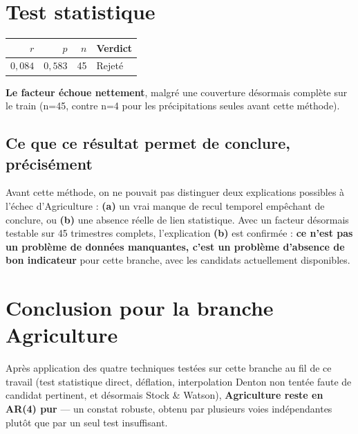 \documentclass[11pt,a4paper]{article}
\begin{document}
\section{Test statistique}

\begin{alertebox}
\begin{center}
\begin{tabular}{rrrl}
\toprule
$r$ & $p$ & $n$ & \textbf{Verdict} \\
\midrule
$0{,}084$ & $0{,}583$ & 45 & Rejeté \\
\bottomrule
\end{tabular}
\end{center}

\textbf{Le facteur échoue nettement}, malgré une couverture désormais complète sur le train (n=45, contre n=4 pour les précipitations seules avant cette méthode).
\end{alertebox}

\subsection{Ce que ce résultat permet de conclure, précisément}

\begin{noteboxbleu}
Avant cette méthode, on ne pouvait pas distinguer deux explications possibles à l'échec d'Agriculture : \textbf{(a)} un vrai manque de recul temporel empêchant de conclure, ou \textbf{(b)} une absence réelle de lien statistique. Avec un facteur désormais testable sur 45 trimestres complets, l'explication \textbf{(b)} est confirmée : \textbf{ce n'est pas un problème de données manquantes, c'est un problème d'absence de bon indicateur} pour cette branche, avec les candidats actuellement disponibles.
\end{noteboxbleu}

\section{Conclusion pour la branche Agriculture}

\begin{fichebox}
Après application des quatre techniques testées sur cette branche au fil de ce travail (test statistique direct, déflation, interpolation Denton non tentée faute de candidat pertinent, et désormais Stock \& Watson), \textbf{Agriculture reste en AR(4) pur} --- un constat robuste, obtenu par plusieurs voies indépendantes plutôt que par un seul test insuffisant.
\end{fichebox}
\end{document}
